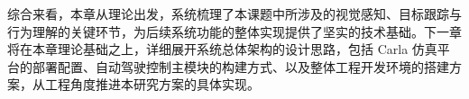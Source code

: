 综合来看，本章从理论出发，系统梳理了本课题中所涉及的视觉感知、目标跟踪与行为理解的关键环节，为后续系统功能的整体实现提供了坚实的技术基础。下一章将在本章理论基础之上，详细展开系统总体架构的设计思路，包括 Carla 仿真平台的部署配置、自动驾驶控制主模块的构建方式、以及整体工程开发环境的搭建方案，从工程角度推进本研究方案的具体实现。



\begin{tabular}{l l}
\end{tabular}
